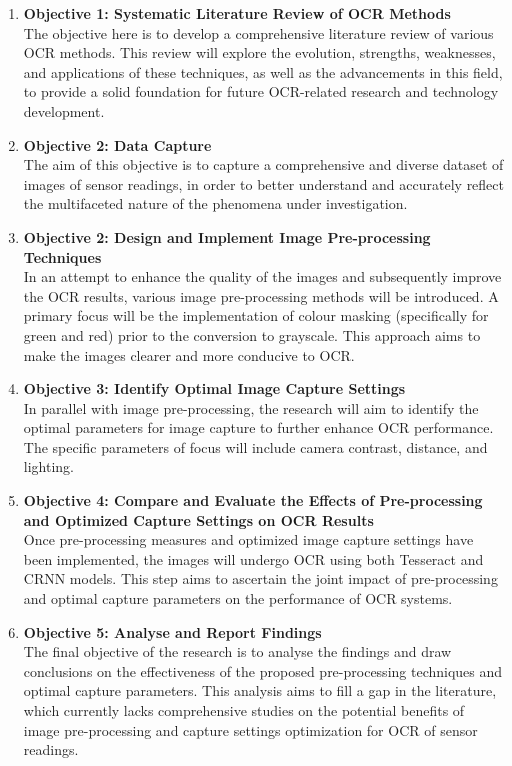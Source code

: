 \begin{enumerate}

      \item \textbf{Objective 1: Systematic Literature Review of OCR Methods}\\
            The objective here is to develop a comprehensive literature review of various OCR methods. This review will explore the evolution, strengths, weaknesses, and applications of these techniques, as well as the advancements in this field, to provide a solid foundation for future OCR-related research and technology development.


      \item \textbf{Objective 2: Data Capture}\\
            The aim of this objective is to capture a comprehensive and diverse dataset of images of sensor readings, in order to better understand and accurately reflect the multifaceted nature of the phenomena under investigation.

      \item \textbf{Objective 2: Design and Implement Image Pre-processing Techniques}\\
            In an attempt to enhance the quality of the images and subsequently improve the OCR results, various image pre-processing methods will be introduced. A primary focus will be the implementation of colour masking (specifically for green and red) prior to the conversion to grayscale. This approach aims to make the images clearer and more conducive to OCR.

      \item \textbf{Objective 3: Identify Optimal Image Capture Settings}\\
            In parallel with image pre-processing, the research will aim to identify the optimal parameters for image capture to further enhance OCR performance. The specific parameters of focus will include camera contrast, distance, and lighting.

      \item \textbf{Objective 4: Compare and Evaluate the Effects of Pre-processing and Optimized Capture Settings on OCR Results}\\
            Once pre-processing measures and optimized image capture settings have been implemented, the images will undergo OCR using both Tesseract and CRNN models. This step aims to ascertain the joint impact of pre-processing and optimal capture parameters on the performance of OCR systems.

      \item \textbf{Objective 5: Analyse and Report Findings}\\
            The final objective of the research is to analyse the findings and draw conclusions on the effectiveness of the proposed pre-processing techniques and optimal capture parameters. This analysis aims to fill a gap in the literature, which currently lacks comprehensive studies on the potential benefits of image pre-processing and capture settings optimization for OCR of sensor readings.
\end{enumerate}

